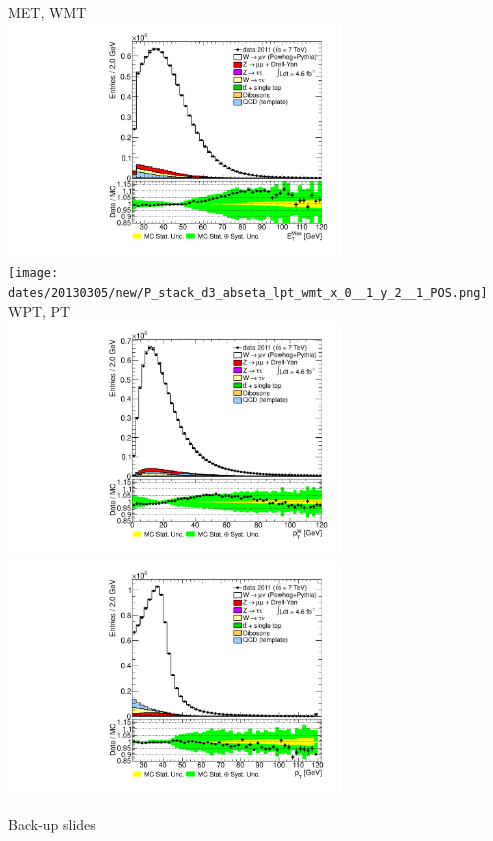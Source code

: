  {
\colb[T]

MET, WMT \\
\centering
\includegraphics[width=0.66\textwidth]{dates/20130305/new/P_stack_d3_abseta_lpt_met_x_0__1_y_2__1_POS.pdf} \\
\texttt{[image: dates/20130305/new/P\_stack\_d3\_abseta\_lpt\_wmt\_x\_0\_\_1\_y\_2\_\_1\_POS.png]}
WPT, PT \\
\centering
\includegraphics[width=0.66\textwidth]{dates/20130305/new/P_stack_d3_abseta_lpt_wpt_x_0__1_y_2__1_POS} \\
\includegraphics[width=0.66\textwidth]{dates/20130305/new/P_stack_lpt_POS} 
\cole
}


\appendix
{}
\setcounter{finalframe}{\value{framenumber}}

\slide{}
{

\centering
\Huge Back-up slides
}
